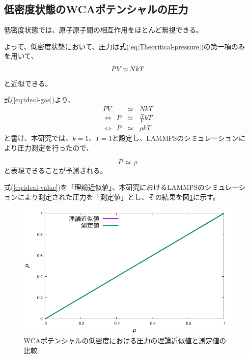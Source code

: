 \documentclass[titlepage]{jsreport}
\begin{document}
{{{\subsection{低密度状態のWCAポテンシャルの圧力}\label{results-subsec:WCA-press-low-density}
低密度状態では、原子原子間の相互作用をほとんど無視できる。

よって、低密度状態において、圧力は式(\ref{eq:Theoritical-pressure})の第一項のみを用いて、
\large
\begin{equation}
PV\,{\simeq}\,NkT{\label{eq:ideal-gas}}
\end{equation}
\normalsize
と近似できる。


式(\ref{eq:ideal-gas})より、
\large
\begin{eqnarray}
PV\,&{\simeq}&\,NkT\nonumber\\
{\Leftrightarrow}{\ }{\ }P\,&{\simeq}&\,{\frac{N}{V}}kT\nonumber\\
{\Leftrightarrow}{\ }{\ }P\,&{\simeq}&\,{\rho}kT\nonumber
\end{eqnarray}
\normalsize
と書け、本研究では、$k=1$、$T=1$と設定し、LAMMPSのシミュレーションにより圧力測定を行ったので、

\large
\begin{equation}
P\,{\simeq}\,{\rho} \label{eq:ideal-value}
\end{equation}
\normalsize
と表現できることが予測される。

式(\ref{eq:ideal-value})を「理論近似値」、本研究におけるLAMMPSのシミュレーションにより測定された圧力を「測定値」とし、その結果を図\ref{fig:lowden_compare:den-pre}に示す。

\begin{figure}[htbp]
    \begin{center}
        \includegraphics[width=14cm]{fig/lowden_compare:den-pre.pdf}
    \end{center}
    \caption{WCAポテンシャルの低密度における圧力の理論近似値と測定値の比較}
    \label{fig:lowden_compare:den-pre}
\end{figure}


}}}
\end{document}
